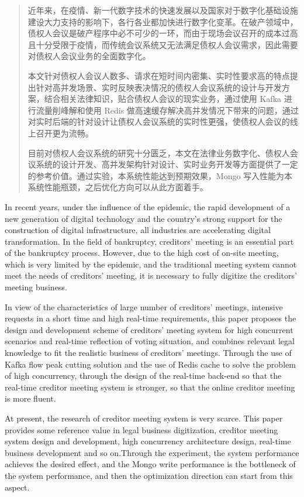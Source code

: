
\begin{abstract}
  近年来，在疫情、新一代数字技术的快速发展以及国家对于数字化基础设施建设大力支持的影响下，各行各业都加快进行数字化变革。在破产领域中，债权人会议是破产程序中必不可少的一环，而由于现场会议召开的成本过高且十分受限于疫情，而传统会议系统又无法满足债权人会议需求，因此需要对债权人会议业务的全面数字化。
  
  本文针对债权人会议人数多、请求在短时间内密集、实时性要求高的特点提出针对高并发场景、实时反映表决情况的债权人会议系统的设计与开发方案，结合相关法律知识，贴合债权人会议的现实业务，通过使用 Kafka 进行流量削峰解和使用 Redis 做高速缓存解决高并发情况下带来的问题，通过对实时后端的针对设计让债权人会议系统的实时性更强，使债权人会议的线上召开更为流畅。
  
  目前对债权人会议系统的研究十分匮乏，本文在法律业务数字化、债权人会议系统的设计开发、高并发架构针对设计、实时业务开发等方面提供了一定的参考价值。通过实验，本系统性能达到预期效果，Mongo 写入性能为本系统性能瓶颈，之后优化方向可以从此方面着手。
\end{abstract}

\begin{abstract*}
  In recent years, under the influence of the epidemic, the rapid development of a new generation of digital technology and the country's strong support for the construction of digital infrastructure, all industries are accelerating digital transformation. In the field of bankruptcy, creditors' meeting is an essential part of the bankruptcy process. However, due to the high cost of on-site meeting, which is very limited by the epidemic, and the traditional meeting system cannot meet the needs of creditors' meeting, it is necessary to fully digitize the creditors' meeting business.



  In view of the characteristics of large number of creditors' meetings, intensive requests in a short time and high real-time requirements, this paper proposes the design and development scheme of creditors' meeting system for high concurrent scenarios and real-time reflection of voting situation, and combines relevant legal knowledge to fit the realistic business of creditors' meetings. Through the use of Kafka flow peak cutting solution and the use of Redis cache to solve the problem of high concurrency, through the design of the real-time back-end so that the real-time creditor meeting system is stronger, so that the online creditor meeting is more fluent.



  At present, the research of creditor meeting system is very scarce. This paper provides some reference value in legal business digitization, creditor meeting system design and development, high concurrency architecture design, real-time business development and so on.Through the experiment, the system performance achieves the desired effect, and the Mongo write performance is the bottleneck of the system performance, and then the optimization direction can start from this aspect.
\end{abstract*}

